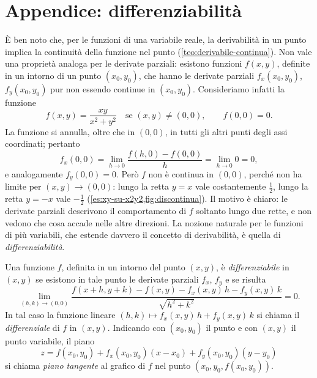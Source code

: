\section{Appendice: differenziabilità}
\label{sec:differenziabilita}

È ben noto che, per le funzioni di una variabile reale, la derivabilità in un punto
implica la continuità della funzione nel punto (\cref{teo:derivabile-continua}). Non vale
una proprietà analoga per le derivate parziali: esistono funzioni $f(x,y)$, definite in un
intorno di un punto $(x_{0},y_{0})$, che hanno le derivate parziali
$f_{x}(x_{0},y_{0})$, $f_{y}(x_{0},y_{0})$ pur non essendo continue in $(x_{0},y_{0})$.
Consideriamo infatti la funzione
\begin{equation}\label{eq:f-discontinua}
  f(x,y)=\frac{xy}{x^{2}+y^{2}} \quad\text{se }(x,y)\neq(0,0), \qquad f(0,0)=0 .
\end{equation}
La funzione si annulla, oltre che in $(0,0)$, in tutti gli altri punti degli assi
coordinati; pertanto
\[
  f_{x}(0,0)=\lim_{h\to0}\frac{f(h,0)-f(0,0)}{h}=\lim_{h\to0}0=0,
\]
e analogamente $f_{y}(0,0)=0$. Però $f$ non è continua in $(0,0)$, perché non ha limite
per $(x,y)\to(0,0)$: lungo la retta $y=x$ vale costantemente $\frac12$, lungo la retta
$y=-x$ vale $-\frac12$ (\cref{es:xy-su-x2y2,fig:discontinua}). Il motivo è chiaro: le
derivate parziali descrivono il comportamento di $f$ soltanto lungo due rette, e non
vedono che cosa accade nelle altre direzioni. La nozione naturale per le funzioni di più
variabili, che estende davvero il concetto di derivabilità, è quella di
\emph{differenziabilità}.

\begin{definizione}\label{def:differenziabile}
Una funzione $f$, definita in un intorno del punto $(x,y)$, è \emph{differenziabile} in
$(x,y)$ se esistono in tale punto le derivate parziali $f_{x}$, $f_{y}$ e se risulta
\begin{equation}\label{eq:differenziabile}
  \lim_{(h,k)\to(0,0)}\frac{f(x+h,y+k)-f(x,y)-f_{x}(x,y)\,h-f_{y}(x,y)\,k}{\sqrt{h^{2}+k^{2}}}=0 .
\end{equation}
In tal caso la funzione lineare $(h,k)\mapsto f_{x}(x,y)\,h+f_{y}(x,y)\,k$ si chiama il
\emph{differenziale} di $f$ in $(x,y)$. Indicando con $(x_{0},y_{0})$ il punto e con
$(x,y)$ il punto variabile, il piano
\begin{equation}\label{eq:piano-tangente}
  z=f(x_{0},y_{0})+f_{x}(x_{0},y_{0})(x-x_{0})+f_{y}(x_{0},y_{0})(y-y_{0})
\end{equation}
si chiama \emph{piano tangente} al grafico di $f$ nel punto $(x_{0},y_{0},f(x_{0},y_{0}))$.
\end{definizione}

